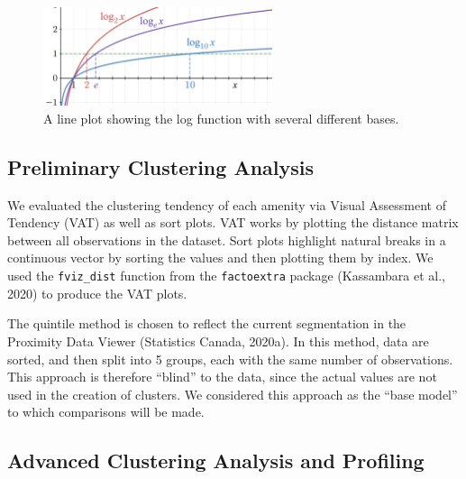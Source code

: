\documentclass[11pt, a4paper]{article}
\begin{document}
\begin{figure}[H]
\centering
\includegraphics[width=0.6\textwidth]{./distributions/logtransform.png}
\caption[Log-transform]{A line plot showing the log function with several different bases.}\label{logtransform}
\end{figure}







\subsection{Preliminary Clustering Analysis}


We evaluated the clustering tendency of each amenity via Visual Assessment of Tendency (VAT) as well as sort plots. VAT works by plotting the distance matrix between all observations in the dataset. Sort plots highlight natural breaks in a continuous vector by sorting the values and then plotting them by index. We used the \texttt{fviz\_dist} function from the \texttt{factoextra} package (Kassambara et al., 2020) to produce the VAT plots.
\par
The quintile method is chosen to reflect the current segmentation in the Proximity Data Viewer (Statistics Canada, 2020a). In this method, data are sorted, and then split into 5 groups, each with the same number of observations.  This approach is  therefore ``blind'' to the data, since the actual values are not used in the creation of clusters. We considered this approach as the ``base model'' to which comparisons will be made.






\subsection{Advanced Clustering Analysis and Profiling}
\end{document}
